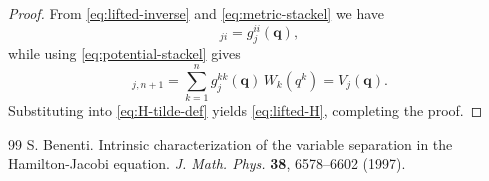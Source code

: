 \documentclass[10pt,a4paper]{amsart}
\begin{document}
\begin{proof}
	From \eqref{eq:lifted-inverse} and \eqref{eq:metric-stackel} we have
	\begin{equation}
		[\mathcal{L}^{-1}]_{ji}=g^{ii}_j(\boldsymbol{q}),
	\end{equation}
	while using \eqref{eq:potential-stackel} gives
	\begin{equation}
		[\mathcal{L}^{-1}]_{j,n+1}
		= \sum_{k=1}^n g^{kk}_j(\boldsymbol{q})\, W_k(q^k)
		= V_j(\boldsymbol{q}).
	\end{equation}
	Substituting into \eqref{eq:H-tilde-def} yields \eqref{eq:lifted-H}, completing
	the proof.
\end{proof}

\begin{thebibliography}{99}
 S. Benenti. Intrinsic characterization of the variable separation in the Hamilton-Jacobi equation. \textit{J. Math. Phys.} \textbf{38}, 6578--6602 (1997).
\end{thebibliography}
\end{document}
